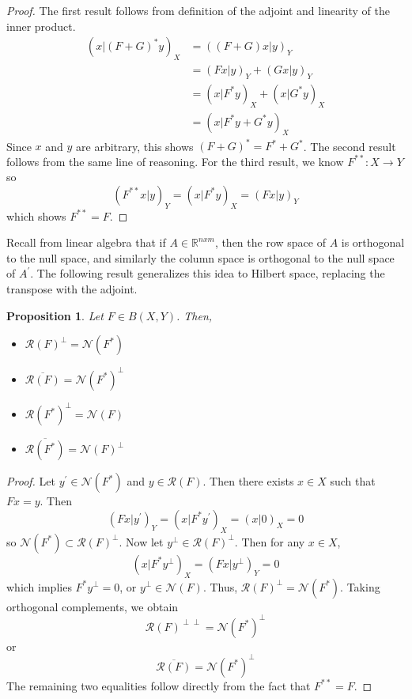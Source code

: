 \documentclass[12pt]{article}
\newtheorem{prop}{Proposition}
\begin{document}
\begin{proof} 
The first result follows from definition of the adjoint and linearity of the inner product. 
\begin{align*} 
(x|(F + G)^*y)_X &= ((F + G)x|y)_Y \\
                           &= (Fx|y)_Y + (Gx|y)_Y \\
                           &= (x|F^*y)_X + (x|G^*y)_X \\
                           &= (x|F^*y + G^*y)_X
\end{align*} 
Since $x$ and $y$ are arbitrary, this shows $(F + G)^* = F^* + G^*$. The second result follows from the 
same line of reasoning. For the third result, we know $F^{**}: X \to Y$ so 
\begin{equation*} 
(F^{**}x|y)_Y = (x|F^*y)_X = (Fx|y)_Y
\end{equation*} 
which shows $F^{**} = F$.
\end{proof} 

Recall from linear algebra that if $A \in \mathbb{R}^{n x m}$, then the row space of $A$ is orthogonal to 
the null space, and similarly the column space is orthogonal to the null space of $A^\prime$. The following
result generalizes this idea to Hilbert space, replacing the transpose with the adjoint. 

\begin{prop} \label{subspace_equalities}
Let $F \in B(X, Y)$. Then, 
\begin{itemize} 
\item $\mathcal{R}(F)^\perp = \mathcal{N}(F^*)$
\item $\overline{\mathcal{R}(F)} = \mathcal{N}(F^*)^\perp$
\item $\mathcal{R}(F^*)^\perp = \mathcal{N}(F)$
\item $\overline{\mathcal{R}(F^*)} = \mathcal{N}(F)^\perp$
\end{itemize} 
\end{prop} 

\begin{proof} 
Let $y^\prime \in \mathcal{N}(F^*)$ and $y \in \mathcal{R}(F)$. Then there exists $x \in X$
such that $Fx = y$. Then \[(Fx|y^\prime)_Y = (x|F^*y^\prime)_X = (x|0)_X = 0\]
so $\mathcal{N}(F^*) \subset \mathcal{R}(F)^\perp$. Now let $y^\perp \in \mathcal{R}(F)^\perp$. 
Then for any $x \in X$, \[(x|F^*y^\perp)_X = (Fx|y^\perp)_Y = 0\]
which implies $F^*y^\perp = 0$, or $y^\perp \in \mathcal{N}(F)$. 
Thus, $\mathcal{R}(F)^\perp = \mathcal{N}(F^*)$. Taking orthogonal complements, we obtain 
\[\mathcal{R}(F)^{\perp\perp} = \mathcal{N}(F^*)^\perp\]
or 
\[\overline{\mathcal{R}(F)} = \mathcal{N}(F^*)^\perp\]
The remaining two equalities follow directly from the fact that $F^{**} = F$. 
\end{proof} 
\end{document}
